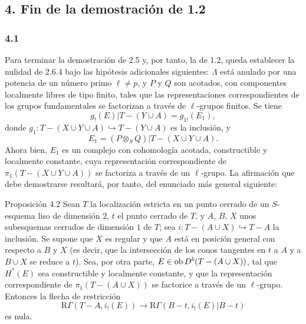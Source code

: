 \subsection*{4. Fin de la demostración de 1.2}

\subsubsection*{4.1}
Para terminar la demostración de 2.5 y, por tanto, la de 1.2, queda establecer la nulidad de 2.6.4 bajo las hipótesis adicionales siguientes: $\Lambda$ está anulado por una potencia de un número primo $\ell\ne p$, y $P$ y $Q$ son acotados, con componentes localmente libres de tipo finito, tales que las representaciones correspondientes de los grupos fundamentales se factorizan a través de $\ell$-grupos finitos. Se tiene
\[
g_!(E)|T-(Y\cup A)=g_{1!}(E_1),
\]
donde $g_1:T-(X\cup Y\cup A)\hookrightarrow T-(Y\cup A)$ es la inclusión, y
\[
E_1=(P\otimes_S Q)|T-(X\cup Y\cup A).
\]
Ahora bien, $E_1$ es un complejo con cohomología acotada, constructible y localmente constante, cuya representación correspondiente de $\pi_1(T-(X\cup Y\cup A))$ se factoriza a través de un $\ell$-grupo. La afirmación que debe demostrarse resultará, por tanto, del enunciado más general siguiente:

\begin{statement}{Proposición 4.2}
Sean $T$ la localización estricta en un punto cerrado de un $S$-esquema liso de dimensión $2$, $t$ el punto cerrado de $T$, y $A$, $B$, $X$ unos subesquemas cerrados de dimensión $1$ de $T$; sea $i:T-(A\cup X)\hookrightarrow T-A$ la inclusión. Se supone que $X$ es regular y que $A$ está en posición general con respecto a $B$ y $X$ (es decir, que la intersección de los conos tangentes en $t$ a $A$ y a $B\cup X$ se reduce a $t$). Sea, por otra parte, $E\in\operatorname{ob} D^b(T-(A\cup X))$, tal que $H^*(E)$ sea constructible y localmente constante, y que la representación correspondiente de $\pi_1(T-(A\cup X))$ se factorice a través de un $\ell$-grupo. Entonces la flecha de restricción
\[
\mathrm R\Gamma(T-A,i_!(E))
\longrightarrow
\mathrm R\Gamma(B-t,i_!(E)|B-t)
\]
es nula.
\end{statement}
